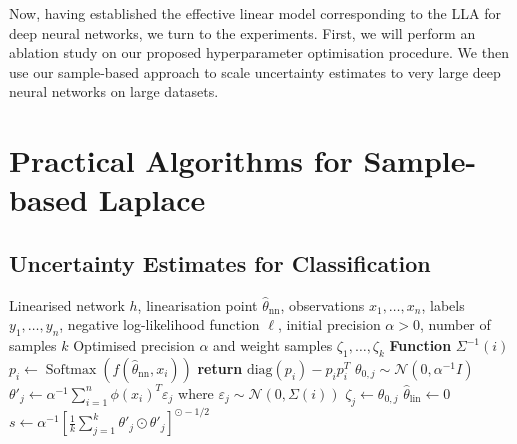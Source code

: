 Now, having established the effective linear model corresponding to the LLA for deep neural networks, we turn to the experiments. First, we will perform an ablation study on our proposed hyperparameter optimisation procedure. We then use our sample-based approach to scale uncertainty estimates to very large deep neural networks on large datasets.

\section{Practical Algorithms for Sample-based Laplace}

\subsection{Uncertainty Estimates for Classification} 
\begin{algorithm}[t]
    \caption{Sampling-based linearised Laplace inference for image classification}
    \label{alg:sampling_classification}
    \begin{algorithmic}
    \Require Linearised network $h$, linearisation point $\hat{\theta}_{\text{nn}}$, observations $x_1,\dotsc,x_n$, labels $y_1, \dotsc, y_n$, negative log-likelihood function $\ell$, initial precision $\alpha > 0$, number of samples $k$
    \Ensure Optimised precision $\alpha$ and weight samples $\zeta_1, \dotsc, \zeta_k$
    \vspace{2mm}
    \State \textbf{Function} $\Sigma^{-1}(i)$
        \State \hspace{\algorithmicindent} $p_i \gets \operatorname{Softmax}(f(\hat{\theta}_{\text{nn}}, x_i))$ 
        \State \hspace{\algorithmicindent} \textbf{return} $\text{diag}(p_i) - p_i p_i^T$
    \vspace{2mm}
     
        \State $\theta_{0, j} \sim \mathcal{N}(0, \alpha^{-1} I)$ 
        \State $\theta'_j \gets \alpha^{-1} \sum_{i=1}^n \phi(x_i)^T  \varepsilon_{j}$ where $\varepsilon_{j} \sim \mathcal{N}(0, \Sigma(i))$ 
        \State $\zeta_j \gets \theta_{0, j}$
    \EndFor
    \State $\hat{\theta}_{\text{lin}} \gets 0$ 
    \State $s \gets \alpha^{-1} \left[ \frac{1}{k} \sum_{j=1}^k \theta'_j \odot \theta'_j \right]^{\odot -1/2}$ 
    \vspace{2mm}

\end{algorithmic}
\end{algorithm}
